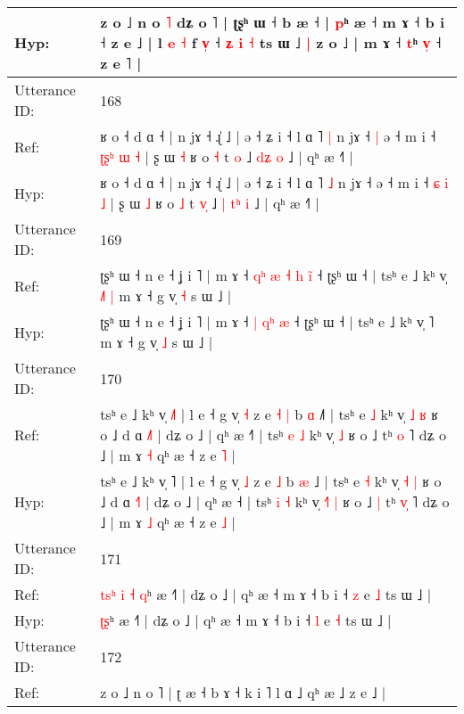\documentclass[10pt]{article}
\DeclareRobustCommand{\hl}[1]{{\textcolor{red}{#1}}}
\begin{document}
\begin{longtable}{ll}
 \\
Hyp: & z o ˩ n o \hl{˥} dʑ o ˥ | ʈʂʰ ɯ ˧ b æ ˧ | \hl{p}ʰ æ ˧ m ɤ ˧ b i ˧ z e ˩ | l \hl{e} \hl{˧} f \hl{v}\hl{̩} ˧ \hl{ʑ} \hl{i} \hl{˧} ts ɯ ˩\hl{ }\hl{|} z o ˩ | m ɤ ˧ \hl{t}ʰ \hl{v}\hl{̩} ˧ z e ˥ |
 \\
\midrule
Utterance ID: & 168 \\
Ref: & ʁ o ˧ d ɑ ˧ | n jɤ ˧ ɻ̍ ˩ | ə ˧ ʑ i ˧ l ɑ ˥ \hl{|} n jɤ ˧\hl{ }\hl{|} ə ˧ m i ˧ \hl{ʈ}\hl{ʂ}\hl{ʰ} \hl{ɯ} \hl{˧} | ʂ ɯ \hl{˧} ʁ o \hl{˧} t \hl{}\hl{o} ˩\hl{}\hl{} \hl{d}\hl{ʑ} \hl{o} ˩ | qʰ æ ˧˥ |
 \\
Hyp: & ʁ o ˧ d ɑ ˧ | n jɤ ˧ ɻ̍ ˩ | ə ˧ ʑ i ˧ l ɑ ˥ \hl{˩} n jɤ ˧\hl{}\hl{} ə ˧ m i ˧ \hl{}\hl{}\hl{ɕ} \hl{i} \hl{˩} | ʂ ɯ \hl{˩} ʁ o \hl{˩} t \hl{v}\hl{̩} ˩\hl{ }\hl{|} \hl{t}\hl{ʰ} \hl{i} ˩ | qʰ æ ˧˥ |
 \\
\midrule
Utterance ID: & 169 \\
Ref: & ʈʂʰ ɯ ˧ n e ˧ ʝ i ˥ | m ɤ ˧\hl{ }\hl{q}\hl{ʰ} \hl{æ} \hl{˧}\hl{ }\hl{h} \hl{i}\hl{̃} ˧ ʈʂʰ ɯ ˧ | tsʰ e ˩ kʰ v̩ \hl{˩}˥\hl{ }\hl{|} m ɤ ˧ g v̩ \hl{˧} s ɯ ˩ |
 \\
Hyp: & ʈʂʰ ɯ ˧ n e ˧ ʝ i ˥ | m ɤ ˧\hl{}\hl{}\hl{} \hl{|} \hl{}\hl{q}\hl{ʰ} \hl{}\hl{æ} ˧ ʈʂʰ ɯ ˧ | tsʰ e ˩ kʰ v̩ \hl{}˥\hl{}\hl{} m ɤ ˧ g v̩ \hl{˩} s ɯ ˩ |
 \\
\midrule
Utterance ID: & 170 \\
Ref: & tsʰ e ˩ kʰ v̩ \hl{˩}˥ | l e ˧ g v̩ \hl{˧} z e\hl{ }\hl{˧} \hl{|} b \hl{ɑ} ˩\hl{˥} | tsʰ e \hl{˩} kʰ v̩ \hl{˩} \hl{ʁ} ʁ o ˩ d ɑ \hl{˩}˥ | dʑ o ˩ | qʰ æ ˧\hl{˥} | tsʰ \hl{e} \hl{˩} kʰ v̩\hl{}\hl{}\hl{} \hl{˩} ʁ o ˩\hl{}\hl{} tʰ \hl{}\hl{o} ˥ dʑ o ˩ | m ɤ \hl{˧} qʰ æ ˧ z e \hl{˥} |
 \\
Hyp: & tsʰ e ˩ kʰ v̩ \hl{}˥ | l e ˧ g v̩ \hl{˩} z e\hl{}\hl{} \hl{˩} b \hl{æ} ˩\hl{} | tsʰ e \hl{˧} kʰ v̩ \hl{˧} \hl{|} ʁ o ˩ d ɑ \hl{˧}˥ | dʑ o ˩ | qʰ æ ˧\hl{} | tsʰ \hl{i} \hl{˧} kʰ v̩\hl{ }\hl{˧}\hl{˥} \hl{|} ʁ o ˩\hl{ }\hl{|} tʰ \hl{v}\hl{̩} ˥ dʑ o ˩ | m ɤ \hl{˩} qʰ æ ˧ z e \hl{˩} |
 \\
\midrule
Utterance ID: & 171 \\
Ref: & \hl{t}\hl{s}\hl{ʰ}\hl{ }\hl{i}\hl{ }\hl{˧}\hl{ }\hl{q}ʰ æ ˧˥ | dʑ o ˩ | qʰ æ ˧ m ɤ ˧ b i ˧ \hl{z} e \hl{˩} ts ɯ ˩ |
 \\
Hyp: & \hl{}\hl{}\hl{}\hl{}\hl{}\hl{}\hl{}\hl{ʈ}\hl{ʂ}ʰ æ ˧˥ | dʑ o ˩ | qʰ æ ˧ m ɤ ˧ b i ˧ \hl{l} e \hl{˧} ts ɯ ˩ |
 \\
\midrule
Utterance ID: & 172 \\
Ref: & z o ˩ n o ˥ | ʈ æ ˧ b ɤ ˧ k i ˥ l ɑ ˩\hl{}\hl{} qʰ æ ˩ z e ˩ |

\end{longtable}
\end{document}
